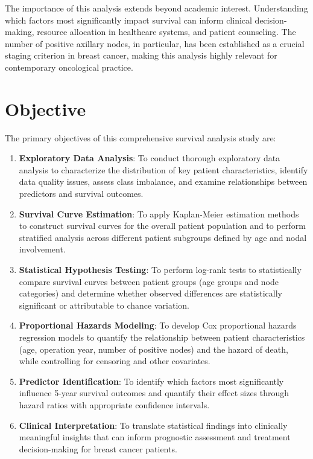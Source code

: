 \documentclass[12pt,a4paper]{article}
\begin{document}
The importance of this analysis extends beyond academic interest. Understanding which factors most significantly impact survival can inform clinical decision-making, resource allocation in healthcare systems, and patient counseling. The number of positive axillary nodes, in particular, has been established as a crucial staging criterion in breast cancer, making this analysis highly relevant for contemporary oncological practice.

\section{Objective}

The primary objectives of this comprehensive survival analysis study are:

\begin{enumerate}
    \item \textbf{Exploratory Data Analysis}: To conduct thorough exploratory data analysis to characterize the distribution of key patient characteristics, identify data quality issues, assess class imbalance, and examine relationships between predictors and survival outcomes.
    
    \item \textbf{Survival Curve Estimation}: To apply Kaplan-Meier estimation methods to construct survival curves for the overall patient population and to perform stratified analysis across different patient subgroups defined by age and nodal involvement.
    
    \item \textbf{Statistical Hypothesis Testing}: To perform log-rank tests to statistically compare survival curves between patient groups (age groups and node categories) and determine whether observed differences are statistically significant or attributable to chance variation.
    
    \item \textbf{Proportional Hazards Modeling}: To develop Cox proportional hazards regression models to quantify the relationship between patient characteristics (age, operation year, number of positive nodes) and the hazard of death, while controlling for censoring and other covariates.
    
    \item \textbf{Predictor Identification}: To identify which factors most significantly influence 5-year survival outcomes and quantify their effect sizes through hazard ratios with appropriate confidence intervals.
    
    \item \textbf{Clinical Interpretation}: To translate statistical findings into clinically meaningful insights that can inform prognostic assessment and treatment decision-making for breast cancer patients.
\end{enumerate}
\end{document}
